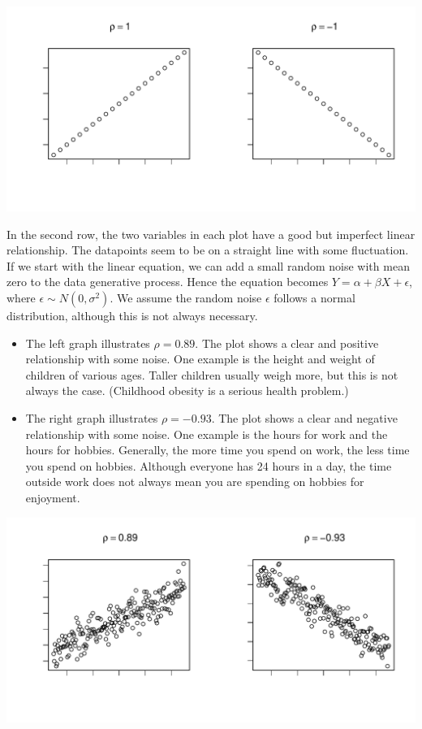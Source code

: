 \documentclass[
]{article}
\begin{document}
\includegraphics{PTT_Analysis_of_Test_Scores_Unfinished_files/figure-latex/perfect-linear-correlation-1.pdf}

In the second row, the two variables in each plot have a good but
imperfect linear relationship. The datapoints seem to be on a straight
line with some fluctuation. If we start with the linear equation, we can
add a small random noise with mean zero to the data generative process.
Hence the equation becomes \(Y = \alpha + \beta X + \epsilon\), where
\(\epsilon \sim N(0,\sigma^2)\). We assume the random noise \(\epsilon\)
follows a normal distribution, although this is not always necessary.

\begin{itemize}
\item
  The left graph illustrates \(\rho = 0.89\). The plot shows a clear and
  positive relationship with some noise. One example is the height and
  weight of children of various ages. Taller children usually weigh
  more, but this is not always the case. (Childhood obesity is a serious
  health problem.)
\item
  The right graph illustrates \(\rho = -0.93\). The plot shows a clear
  and negative relationship with some noise. One example is the hours
  for work and the hours for hobbies. Generally, the more time you spend
  on work, the less time you spend on hobbies. Although everyone has 24
  hours in a day, the time outside work does not always mean you are
  spending on hobbies for enjoyment.
\end{itemize}

\includegraphics{PTT_Analysis_of_Test_Scores_Unfinished_files/figure-latex/high-correlation-1.pdf}
\end{document}
